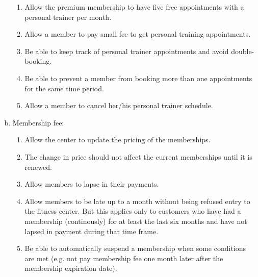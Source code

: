 \documentclass[11pt]{article}
\begin{document}
\begin{enumerate}[(a)]
\begin{enumerate}[(1)]
\item Allow the premium membership to have five free appointments with a personal trainer per month.
\item Allow a member to pay small fee to get personal training appointments.
\item Be able to keep track of personal trainer appointments and avoid double-booking.
\item Be able to prevent a member from booking more than one appointments for the same time period.
\item Allow a member to cancel her/his personal trainer schedule.
\end{enumerate}
\item Membership fee:
\begin{enumerate}[(1)]
\item Allow the center to update the pricing of the memberships.
\item The change in price should not affect the current memberships until it is renewed.
\item Allow members to lapse in their payments.
\item Allow members to be late up to a month without being refused entry to the fitness center. But this applies only to customers who have had a membership (continously) for at least the last six months and have not lapsed in payment during that time frame.
\item Be able to automatically suspend a membership when some conditions are met (e.g. not pay membership fee one month later after the membership expiration date).
\end{enumerate}
\end{enumerate}

\end{document}
